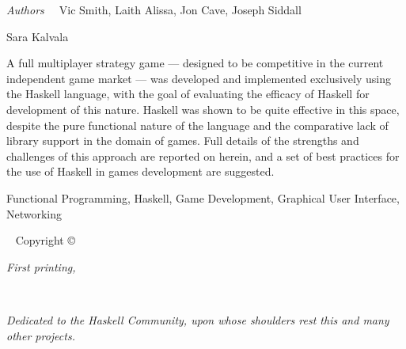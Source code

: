 \newpage
\begin{fullwidth}
	{\large {\it Authors\ \ } Vic Smith, Laith Alissa, Jon Cave, Joseph Siddall
	
	\vspace{1em} Sara Kalvala
	
	\vspace{1em} A full multiplayer strategy game --- designed to be competitive in the current independent game market --- was developed and implemented exclusively using the Haskell language, with the goal of evaluating the efficacy of Haskell for development of this nature. Haskell was shown to be quite effective in this space, despite the pure functional nature of the language and the comparative lack of library support in the domain of games. Full details of the strengths and challenges of this approach are reported on herein, and a set of best practices for the use of Haskell in games development are suggested.
	
	\vspace{1em} Functional Programming, Haskell, Game Development, Graphical User Interface, Networking
	
	}
	
	~\vfill
	\thispagestyle{empty}
	\setlength{\parindent}{0pt}
	\setlength{\parskip}{\baselineskip}
	Copyright \copyright\ \the\year\ \plainauthor
	
	\par{}
	
	
	\par\textit{First printing, \monthyear}

	\newpage

\end{fullwidth}

~\vfill
\begin{doublespace}
\noindent\fontsize{18}{22}\selectfont\itshape
\nohyphenation
Dedicated to the Haskell Community, upon whose shoulders rest this and many other projects.
\end{doublespace}
\vfill
\vfill


\begin{fullwidth}

\cleardoublepage

\tableofcontents

\cleardoublepage
{} \label{listoffig}
\listoffigures

\cleardoublepage
{} \label{listoflis}
\listoftables

\cleardoublepage
{} \label{listoflis}
\listofvlisting

\end{fullwidth}



